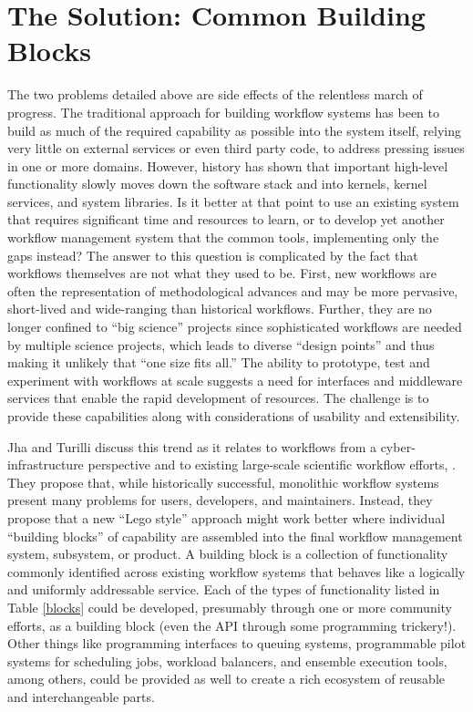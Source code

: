 \section{The Solution: Common Building Blocks}\label{buildings-blocks}

The two problems detailed above are side effects of the relentless march of progress. The traditional approach for building workflow systems has
been to build as much of the required capability as possible into the system
itself, relying very little on external services or even third party code, to address pressing issues in one or more domains. However, history has shown that important high-level functionality slowly moves down the software stack and into kernels, kernel services, and system libraries. Is it better at that point to use an existing system that requires significant time and resources to learn, or to develop yet another workflow management system that the common tools, implementing only the gaps instead? The answer to this question is complicated by the fact that workflows themselves are not what they used to be. First, new workflows are often the representation of methodological advances and may be more pervasive, short-lived and wide-ranging than historical workflows. Further, they are no longer
confined to ``big science'' projects since sophisticated workflows are needed by
multiple science projects, which leads to diverse “design points” and thus
making it unlikely that ``one size fits all.''  The ability to prototype, test
and experiment with workflows at scale suggests a need for interfaces and
middleware services that enable the rapid development of resources. The challenge is to provide these capabilities along with considerations of usability and extensibility.
 
Jha and Turilli discuss this trend as it relates to workflows from a 
cyber-infrastructure perspective and to existing large-scale scientific workflow
efforts, \cite{jha_building_2016}. They propose that, while historically
successful, monolithic workflow systems present many problems for users,
developers, and maintainers. Instead, they propose that a new ``Lego style''
approach might work better where individual ``building blocks'' of capability
are assembled into the final workflow management system, subsystem, or product. A building block is a collection of functionality commonly identified across existing workflow systems that behaves like a logically and uniformly addressable service. Each of the types of functionality listed in Table \ref{blocks} could be developed, presumably through one or more community efforts, as a building block (even the API through some programming trickery!). Other things like programming interfaces to queuing systems, programmable pilot systems for scheduling jobs, workload balancers, and ensemble execution tools, among others, could be provided as well to create a rich ecosystem of reusable and interchangeable parts.

